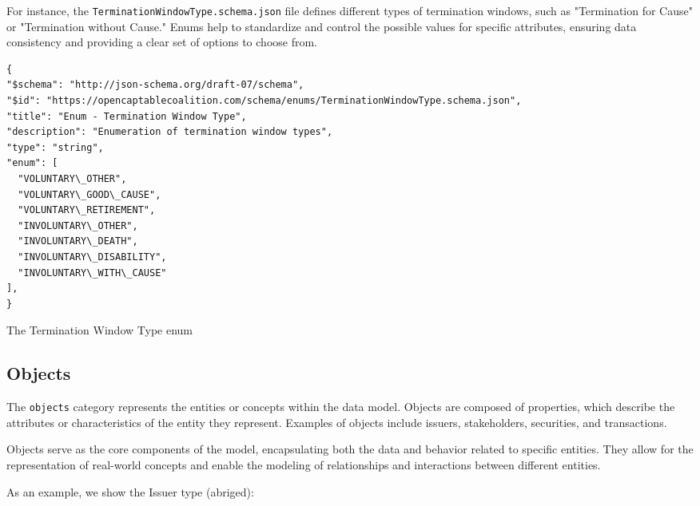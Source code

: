 For instance, the \texttt{TerminationWindowType.schema.json} file defines different types of termination windows, such as "Termination for Cause" or "Termination without Cause." Enums help to standardize and control the possible values for specific attributes, ensuring data consistency and providing a clear set of options to choose from.

\begin{listing}[!h]
\begin{verbatim}
{
"$schema": "http://json-schema.org/draft-07/schema",
"$id": "https://opencaptablecoalition.com/schema/enums/TerminationWindowType.schema.json",
"title": "Enum - Termination Window Type",
"description": "Enumeration of termination window types",
"type": "string",
"enum": [
  "VOLUNTARY\_OTHER",
  "VOLUNTARY\_GOOD\_CAUSE",
  "VOLUNTARY\_RETIREMENT",
  "INVOLUNTARY\_OTHER",
  "INVOLUNTARY\_DEATH",
  "INVOLUNTARY\_DISABILITY",
  "INVOLUNTARY\_WITH\_CAUSE"
],
}
\end{verbatim}
\caption{The Termination Window Type enum}
\label{lst:termination-window-type-enum}
\end{listing}


\subsection{Objects}

The \texttt{objects} category represents the entities or concepts within the data model. Objects are composed of properties, which describe the attributes or characteristics of the entity they represent. Examples of objects include issuers, stakeholders, securities, and transactions.

Objects serve as the core components of the model, encapsulating both the data and behavior related to specific entities. They allow for the representation of real-world concepts and enable the modeling of relationships and interactions between different entities.

As an example, we show the Issuer type (abriged):

